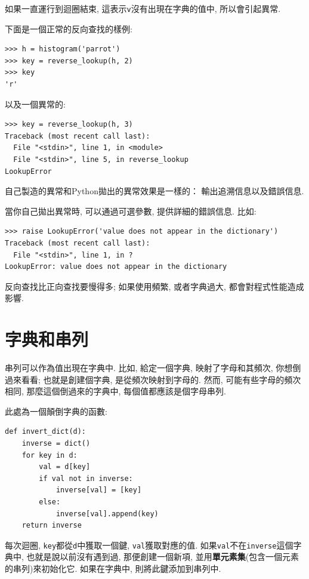 \documentclass[10pt]{book}
\begin{document}
如果一直運行到迴圈結束, 這表示{\tt v}沒有出現在字典的值中, 
所以會引起異常. 

下面是一個正常的反向查找的樣例:

\begin{verbatim}
>>> h = histogram('parrot')
>>> key = reverse_lookup(h, 2)
>>> key
'r'
\end{verbatim}
%
以及一個異常的:

\begin{verbatim}
>>> key = reverse_lookup(h, 3)
Traceback (most recent call last):
  File "<stdin>", line 1, in <module>
  File "<stdin>", line 5, in reverse_lookup
LookupError
\end{verbatim}
%
自己製造的異常和Python拋出的異常效果是一樣的：
輸出追溯信息以及錯誤信息. 

當你自己拋出異常時, 可以通過可選參數, 提供詳細的錯誤信息. 比如:

\begin{verbatim}
>>> raise LookupError('value does not appear in the dictionary')
Traceback (most recent call last):
  File "<stdin>", line 1, in ?
LookupError: value does not appear in the dictionary
\end{verbatim}
%
反向查找比正向查找要慢得多;
如果使用頻繁, 或者字典過大, 都會對程式性能造成影響. 


\section{字典和串列}
\label{invert}

串列可以作為值出現在字典中. 比如, 給定一個字典, 映射了字母和其頻次, 
你想倒過來看看; 也就是創建個字典, 是從頻次映射到字母的. 
然而, 可能有些字母的頻次相同, 那麼這個倒過來的字典中, 每個值都應該是個字母串列. 

此處為一個顛倒字典的函數:

\begin{verbatim}
def invert_dict(d):
    inverse = dict()
    for key in d:
        val = d[key]
        if val not in inverse:
            inverse[val] = [key]
        else:
            inverse[val].append(key)
    return inverse
\end{verbatim}
%
每次迴圈, {\tt key}都從{\tt d}中獲取一個鍵, {\tt val}獲取對應的值. 
如果{\tt val}不在{\tt inverse}這個字典中, 也就是說以前沒有遇到過, 
那便創建一個新項, 並用{\bf 單元素集}(包含一個元素的串列)來初始化它. 
如果在字典中, 則將此鍵添加到串列中. 
\end{document}

